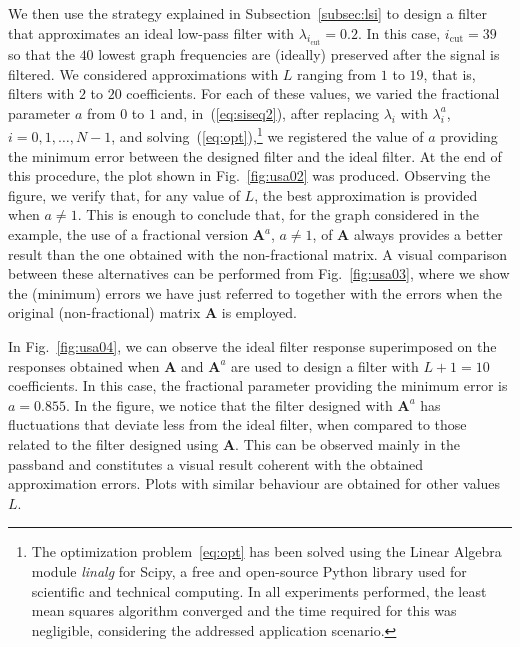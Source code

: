 We then use the strategy explained in Subsection~\ref{subsec:lsi} to design a filter that approximates an ideal low-pass filter with $\lambda_{i_\text{cut}}=0.2$. In this case, $i_\text{cut}=39$ so that the $40$ lowest graph frequencies are (ideally) preserved after the signal is filtered. We considered approximations with $L$ ranging from $1$ to $19$, that is, filters with $2$ to $20$ coefficients. For each of these values, we varied the fractional parameter $a$ from $0$ to $1$ and, in~(\ref{eq:siseq2}), after replacing $\lambda_i$ with $\lambda_i^a$, $i=0,1,\ldots,N-1$, and solving~(\ref{eq:opt}),\footnote{The optimization problem~\ref{eq:opt} has been solved using the Linear Algebra module \emph{linalg} for Scipy, a free and open-source Python library used for scientific and technical computing. In all experiments performed, the least mean squares algorithm converged and the time required for this was negligible, considering the addressed application scenario.} we registered the value of $a$ providing the minimum error between the designed filter and the ideal filter. At the end of this procedure, the plot shown in Fig.~\ref{fig:usa02} was produced. Observing the figure, we verify that, for any value of $L$, the best approximation is provided when $a\neq1$. This is enough to conclude that, for the graph considered in the example, the use of a fractional version $\mathbf{A}^a$, $a\neq 1$, of $\mathbf{A}$ always provides a better result than the one obtained with the non-fractional matrix. A visual comparison between these alternatives can be performed from Fig.~\ref{fig:usa03}, where we show the (minimum) errors we have just referred to together with the errors when the original (non-fractional) matrix $\mathbf{A}$ is employed.

In Fig.~\ref{fig:usa04}, we can observe the ideal filter response superimposed on the responses obtained when $\mathbf{A}$ and $\mathbf{A}^a$ are used to design a filter with $L+1=10$ coefficients. In this case, the fractional parameter providing the minimum error is $a=0.855$. In the figure, we notice that the filter designed with $\mathbf{A}^a$ has fluctuations that deviate less from the ideal filter, when compared to those related to the filter designed using $\mathbf{A}$. This can be observed mainly in the passband and constitutes a visual result coherent with the obtained approximation errors. Plots with similar behaviour are obtained for other values $L$.

